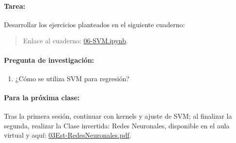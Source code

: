 \documentclass[a4,11pt]{aleph-notas}
\begin{document}
\paragraph{Tarea:}
Desarrollar los ejercicios planteados en el siguiente cuaderno:
\begin{quote}
    Enlace al cuaderno: \href{https://colab.research.google.com/github/andres-merino/AprendizajeAutomaticoInicial-05-N0105/blob/main/2-Ejercicios/06-SVM.ipynb}{06-SVM.ipynb}.
\end{quote}

\paragraph{Pregunta de investigación:}
\begin{enumerate}[leftmargin=*]
    \item ¿Cómo se utiliza SVM para regresión?
\end{enumerate}

\paragraph{Para la próxima clase:}
Tras la primera sesión, continuar con kernels y ajuste de SVM; al finalizar la segunda, realizar la Clase invertida: Redes Neuronales, disponible en el aula virtual y aquí: \href{https://andres-merino.github.io/AprendizajeAutomaticoInicial-05-N0105/2-ClaseInvertida/03Est-RedesNeuronales.pdf}{03Est-RedesNeuronales.pdf}.
\end{document}
